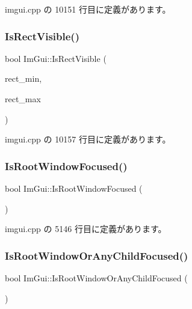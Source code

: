  imgui.\+cpp の 10151 行目に定義があります。

\mbox{\label{namespace_im_gui_a5aca7e6939e07caaca489aa8c776fd81}} 
\subsubsection{\texorpdfstring{Is\+Rect\+Visible()}{IsRectVisible()}\hspace{0.1cm}{\footnotesize\ttfamily [2/2]}}
{\footnotesize\ttfamily bool Im\+Gui\+::\+Is\+Rect\+Visible (\begin{DoxyParamCaption}\item[{const \mbox{\hyperlink{struct_im_vec2}{Im\+Vec2}} \&}]{rect\+\_\+min,  }\item[{const \mbox{\hyperlink{struct_im_vec2}{Im\+Vec2}} \&}]{rect\+\_\+max }\end{DoxyParamCaption})}



 imgui.\+cpp の 10157 行目に定義があります。

\mbox{\label{namespace_im_gui_abf8f15c7648d453142b0dc72bc5ed8ba}} 
\subsubsection{\texorpdfstring{Is\+Root\+Window\+Focused()}{IsRootWindowFocused()}}
{\footnotesize\ttfamily bool Im\+Gui\+::\+Is\+Root\+Window\+Focused (\begin{DoxyParamCaption}{ }\end{DoxyParamCaption})}



 imgui.\+cpp の 5146 行目に定義があります。

\mbox{\label{namespace_im_gui_ad7175b87a80da527fb5ba5bc75993091}} 
\subsubsection{\texorpdfstring{Is\+Root\+Window\+Or\+Any\+Child\+Focused()}{IsRootWindowOrAnyChildFocused()}}
{\footnotesize\ttfamily bool Im\+Gui\+::\+Is\+Root\+Window\+Or\+Any\+Child\+Focused (\begin{DoxyParamCaption}{ }\end{DoxyParamCaption})}



